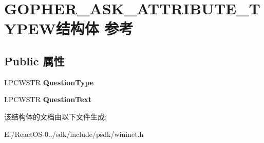 \hypertarget{struct_g_o_p_h_e_r___a_s_k___a_t_t_r_i_b_u_t_e___t_y_p_e_w}{}\section{G\+O\+P\+H\+E\+R\+\_\+\+A\+S\+K\+\_\+\+A\+T\+T\+R\+I\+B\+U\+T\+E\+\_\+\+T\+Y\+P\+E\+W结构体 参考}
\label{struct_g_o_p_h_e_r___a_s_k___a_t_t_r_i_b_u_t_e___t_y_p_e_w}
\subsection*{Public 属性}
\begin{DoxyCompactItemize}
\item 
\mbox{\label{struct_g_o_p_h_e_r___a_s_k___a_t_t_r_i_b_u_t_e___t_y_p_e_w_a3903e93f7eb9b9c213b7d6f8012d8a43}} 
L\+P\+C\+W\+S\+TR {\bfseries Question\+Type}
\item 
\mbox{\label{struct_g_o_p_h_e_r___a_s_k___a_t_t_r_i_b_u_t_e___t_y_p_e_w_ad4ae0db0a36f8796c0794146b5aca45d}} 
L\+P\+C\+W\+S\+TR {\bfseries Question\+Text}
\end{DoxyCompactItemize}


该结构体的文档由以下文件生成\+:\begin{DoxyCompactItemize}
\item 
E\+:/\+React\+O\+S-\/0../sdk/include/psdk/wininet.\+h\end{DoxyCompactItemize}
